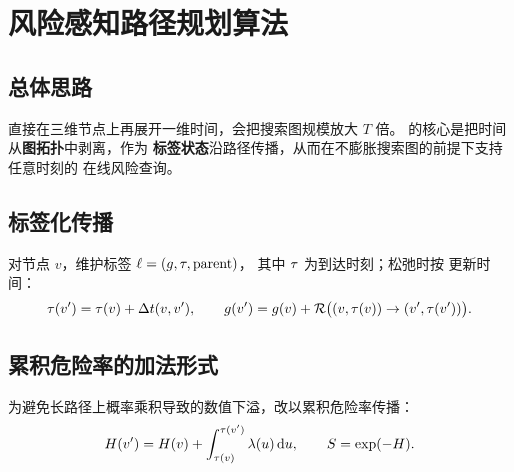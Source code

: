 
\section{\termTD 风险感知路径规划算法}
\label{sec:planning}

\subsection{总体思路}

直接在三维节点上再展开一维时间，会把搜索图规模放大 $T$ 倍。
\methodnamelatex 的核心是把时间从\textbf{图拓扑}中剥离，作为
\textbf{标签状态}沿路径传播，从而在不膨胀搜索图的前提下支持任意时刻的
在线风险查询。

\subsection{标签化传播}

对节点 $v$，维护标签 $\ell = (g, \tau, \mathrm{parent})$，
其中 $\tau$ 为到达时刻；松弛时按
 更新时间：
\begin{equation}
  \tau(v') = \tau(v) + \Delta t(v, v'),
  \qquad
  g(v') = g(v) + \mathcal{R}\bigl((v, \tau(v)) \to (v', \tau(v'))\bigr).
  \label{eq:label-prop}
\end{equation}

\subsection{累积危险率的加法形式}

为避免长路径上概率乘积导致的数值下溢，改以累积危险率传播：
\begin{equation}
  H(v') = H(v) + \int_{\tau(v)}^{\tau(v')} \lambda(u) \, \mathrm{d}u,
  \qquad
  S = \exp(-H).
  \label{eq:cumulative-hazard}
\end{equation}

